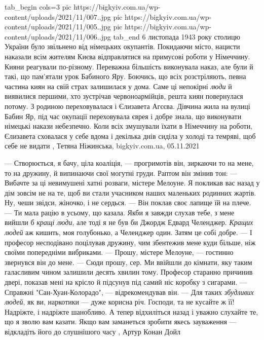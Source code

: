 
\ifcmt
  tab_begin cols=3
     pic https://bigkyiv.com.ua/wp-content/uploads/2021/11/007..jpg
		 pic https://bigkyiv.com.ua/wp-content/uploads/2021/11/005..jpg
     pic https://bigkyiv.com.ua/wp-content/uploads/2021/11/006..jpg
  tab_end
\fi
6 листопада 1943 року столицю України було звільнено від німецьких окупантів.
Покидаючи місто, нацисти наказали всім жителям Києва відправлятися на примусові
роботи у Німеччину. Кияни реагували по-різному. Переважна більшість виконувала
наказ, але були й такі, що пам’ятали урок Бабиного Яру. Боючись, що всіх
розстріляють, певна частина киян на свій страх залишилася у дома. Саме ці
непокірні \emph{люди} й виявилися першими, хто зустрічав червоноармійців, решта
киян повернулася потому.  З родиною переховувалася і Єлизавета Агєєва. Дівчина
жила на вулиці Бабин Яр, під час окупації переховувала єврея і добре знала, що
виконувати німецькі накази небезпечно. Коли всіх змушували їхати в Німеччину на
роботи, Єлизавета сховалася у себе вдома і декілька днів сиділа у холоді та
темряві, щоб себе не видати
, 
Тетяна Ніжинська, bigkyiv.com.ua, 05.11.2021

— Створюється, я бачу, ціла коаліція, — прогримотів він, зиркаючи то на мене,
то на дружину, й випинаючи свої могутні груди. Раптом він змінив тон: — Вибачте
за ці невимушені хатні розваги, містере Мелоуне. Я покликав вас назад у дім
зовсім не на те, щоб ви стали учасником наших маленьких родинних жартів.  Ну,
чеши звідси, жіночко, і не сердься. — Він поклав своє лапище їй на плече.  — Ти
мала рацію в усьому, що казала. Якби я завжди слухав тебе, з мене вийшли б
\emph{кращі люди}, але тоді я не був би Джордж Едвард Челенджер. \emph{Кращих
людей} аж кишить, моя голубонько, а Челенджер один. Затям це собі добре. — І
професор несподівано поцілував дружину, чим збентежив мене куди більше, ніж
своїми попередніми вибриками. — Прошу, містере Мелоуне, — гостинно звернувся
він до мене. — Сюди прошу, сер.  Ми ввійшли до кімнати, яку таким галасливим
чином залишили десять хвилин тому.  Професор старанно причинив двері, показав
мені на крісло й підсунув під самий ніс коробку з сигарами.  — Справжні
"Сан-Хуан-Колорадо", — відрекомендував він.  — Для таких \emph{збудливих
людей}, як ви, наркотики — дуже корисна річ.  Господи, та не кусайте ж її!
Надріжте, і надріжте шанобливо. А тепер відхиліться назад і уважно слухайте те,
що я зволю вам казати. Якщо вам заманеться зробити якесь зауваження —
відкладіть його до слушнішого часу
, Артур Конан Дойл

